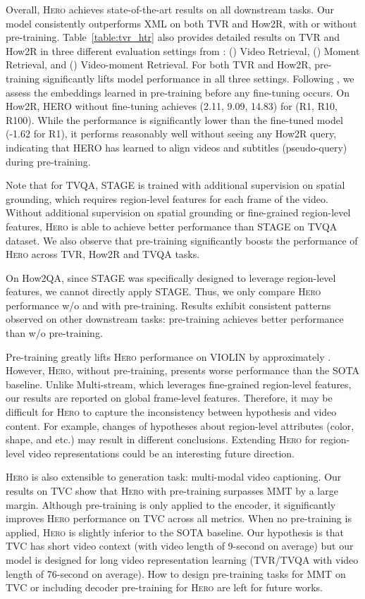 \documentclass[11pt,a4paper]{article}
\begin{document}
Overall, \textsc{Hero} achieves state-of-the-art results on all downstream tasks. Our model consistently outperforms XML on both TVR and How2R, with or without pre-training. Table~\ref{table:tvr_htr} also provides detailed results on TVR and How2R in three different evaluation settings from \citet{lei2020tvr}: () Video Retrieval, () Moment Retrieval, and () Video-moment Retrieval. For both TVR and How2R, pre-training significantly lifts model performance in all three settings.  Following \citet{chen2019uniter, lu2019vilbert}, we assess the embeddings learned in pre-training before any fine-tuning occurs. On How2R, HERO without fine-tuning achieves (2.11, 9.09, 14.83) for (R1, R10, R100). While the performance is significantly lower than the fine-tuned model (-1.62 for R1), it performs reasonably well without seeing any How2R query, indicating that HERO has learned to align videos and subtitles (pseudo-query) during pre-training.


Note that for TVQA, STAGE is trained with additional supervision on spatial grounding, which requires region-level features for each frame of the video. Without additional supervision on spatial grounding or fine-grained region-level features, \textsc{Hero} is able to achieve better performance than STAGE on TVQA dataset. We also observe that pre-training significantly boosts the performance of \textsc{Hero} across TVR, How2R and TVQA tasks. 

On How2QA, since STAGE was specifically designed to leverage region-level features, we cannot directly apply STAGE. Thus, we only compare \textsc{Hero} performance w/o and with pre-training. Results exhibit consistent patterns observed on other downstream tasks: pre-training achieves better performance than w/o pre-training. 

Pre-training greatly lifts \textsc{Hero} performance on VIOLIN by approximately . However, \textsc{Hero}, without pre-training, presents worse performance than the SOTA baseline.  Unlike Multi-stream, which leverages fine-grained region-level features, our results are reported on global frame-level features. Therefore, it may be difficult for \textsc{Hero} to capture the inconsistency between hypothesis and video content.  For example, changes of hypotheses about region-level attributes (color, shape, and etc.) may result in different conclusions.
Extending \textsc{Hero} for region-level video representations could be an interesting future direction.

\textsc{Hero} is also extensible to generation task: multi-modal video captioning. Our results on TVC show that \textsc{Hero} with pre-training surpasses MMT by a large margin. Although pre-training is only applied to the encoder, it significantly improves \textsc{Hero} performance on TVC across all metrics. When no pre-training is applied, \textsc{Hero} is slightly inferior to the SOTA baseline. Our hypothesis is that TVC has short video context (with video length of 9-second on average) but our model is designed for long video representation learning (TVR/TVQA with video length of 76-second on average). 
How to design pre-training tasks for MMT on TVC or including decoder pre-training for \textsc{Hero} are left for future works. 
\end{document}
